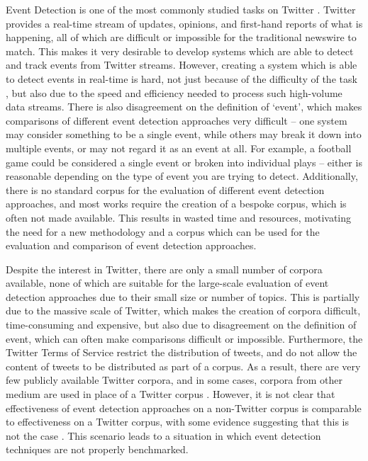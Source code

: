 Event Detection is one of the most commonly studied tasks on Twitter \citep{aggarwalevent,Becker:2012:ICP:2124295.2124360,Zhao:2007:TIF:1619797.1619886,weng2011event,Becker_beyondtrending,Petrovic:2010:SFS:1857999.1858020,10.1109}.
Twitter provides a real-time stream of updates, opinions, and first-hand reports of what is happening, all of which are difficult or impossible for the traditional newswire to match.
This makes it very desirable to develop systems which are able to detect and track events from Twitter streams.
However, creating a system which is able to detect events in real-time is hard, not just because of the difficulty of the task \citep{Allan:2000:FSD:354756.354843}, but also due to the speed and efficiency needed to process such high-volume data streams.
There is also disagreement on the definition of `event', which makes comparisons of different event detection approaches very difficult -- one system may consider something to be a single event, while others may break it down into multiple events, or may not regard it as an event at all.
For example, a football game could be considered a single event or broken into individual plays -- either is reasonable depending on the type of event you are trying to detect.
Additionally, there is no standard corpus for the evaluation of different event detection approaches, and most works require the creation of a bespoke corpus, which is often not made available.
This results in wasted time and resources, motivating the need for a new methodology and a corpus which can be used for the evaluation and comparison of event detection approaches.

Despite the interest in Twitter, there are only a small number of corpora available, none of which are suitable for the large-scale evaluation of event detection approaches due to their small size or number of topics.
This is partially due to the massive scale of Twitter, which makes the creation of corpora difficult, time-consuming and expensive, but also due to disagreement on the definition of event, which can often make comparisons difficult or impossible.
Furthermore, the Twitter Terms of Service restrict the distribution of tweets, and do not allow the content of tweets to be distributed as part of a corpus.
As a result, there are very few publicly available Twitter corpora, and in some cases, corpora from other medium are used in place of a Twitter corpus \citep{aggarwalevent,Petrovic:2010:SFS:1857999.1858020,Petrovic:2012:UPI:2382029.2382072}.
However, it is not clear that effectiveness of event detection approaches on a non-Twitter corpus is comparable to effectiveness on a Twitter corpus, with some evidence suggesting that this is not the case \citep{Petrovic:2012:UPI:2382029.2382072}. This scenario leads to a situation in which event detection techniques are not properly benchmarked.

